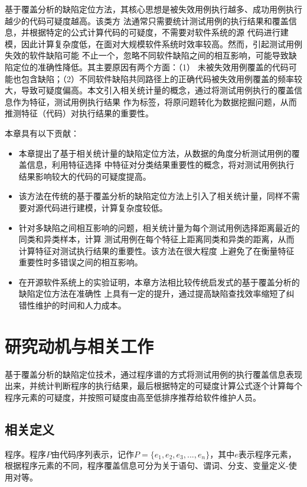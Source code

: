 基于覆盖分析的缺陷定位方法，其核心思想是被失效用例执行越多、成功用例执行越少的代码可疑度越高。该类方
法通常只需要统计测试用例的执行结果和覆盖信息，并根据特定的公式计算代码的可疑度，不需要对软件系统的源
代码进行建模，因此计算复杂度低，在面对大规模软件系统时效率较高。然而，引起测试用例失效的软件缺陷可能
不止一个，忽略不同软件缺陷之间的相互影响，可能导致缺陷定位的准确性降低。其主要原因有两个方面：（1）
未被失效用例覆盖的代码可能也包含缺陷；（2）不同软件缺陷共同路径上的正确代码被失效用例覆盖的频率较
大，导致可疑度偏高。本文引入相关统计量的概念，通过将测试用例执行的覆盖信息作为特征，测试用例执行结果
作为标签，将原问题转化为数据挖掘问题，从而推测特征（代码）对执行结果的重要性。

本章具有以下贡献：
\begin{itemize}
      \item 本章提出了基于相关统计量的缺陷定位方法，从数据的角度分析测试用例的覆盖信息，利用特征选择
中特征对分类结果重要性的概念，将对测试用例执行结果影响较大的代码的可疑度提高。
      \item 该方法在传统的基于覆盖分析的缺陷定位方法上引入了相关统计量，同样不需要对源代码进行建模，计算复杂度较低。
      \item 针对多缺陷之间相互影响的问题，相关统计量为每个测试用例选择距离最近的同类和异类样本，计算
      测试用例在每个特征上距离同类和异类的距离，从而计算特征对测试执行结果的重要性。该方法在很大程度
      上避免了在衡量特征重要性时多错误之间的相互影响。
      \item 在开源软件系统上的实验证明，本章方法相比较传统启发式的基于覆盖分析的缺陷定位方法在准确性
      上具有一定的提升，通过提高缺陷查找效率缩短了纠错性维护的时间和人力成本。
\end{itemize}

\section{研究动机与相关工作}
基于覆盖分析的缺陷定位技术，通过程序谱的方式将测试用例的执行覆盖信息表现出来，并统计判断程序的执行结果，最后根据特定的可疑度计算公式逐个计算每个程序元素的可疑度，并按照可疑度由高至低排序推荐给软件维护人员。

\subsection{相关定义}
\begin{Definition}
      程序。程序$P$由代码序列表示，记作$P=\{e_1, e_2, e_3, ..., e_n\}$，其中$e$表示程序元素，根据程序元素的不同，程序覆盖信息可分为关于语句、谓词、分支、变量定义-使用对等。
\end{Definition}

